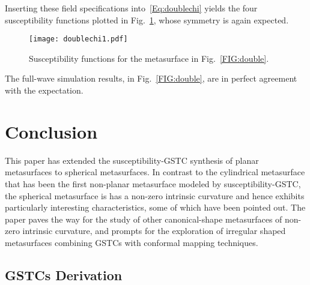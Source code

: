 \documentclass[journal,transaction]{IEEEtran}
\newcommand{\figref}{Fig.~\ref}
\begin{document}
Inserting these field specifications into~\eqref{Eq:doublechi} yields the four susceptibility functions plotted in \figref{FIG:doublechi}, whose symmetry is again expected.

\begin{figure}[!h]
    \centering
         \texttt{[image: doublechi1.pdf]}{
        }
        \caption{Susceptibility functions for the metasurface in \figref{FIG:double}.}
   \label{FIG:doublechi}
\end{figure}

The full-wave simulation results, in \figref{FIG:double}, are in perfect agreement with the expectation.


\section{Conclusion}
\label{sec:concl}

This paper has extended the susceptibility-GSTC synthesis of planar metasurfaces to spherical metasurfaces. In contrast to the cylindrical metasurface that has been the first non-planar metasurface modeled by susceptibility-GSTC, the spherical metasurface is has a non-zero intrinsic curvature and hence exhibits particularly interesting characteristics, some of which have been pointed out. The paper paves the way for the study of other canonical-shape metasurfaces of non-zero intrinsic curvature, and prompts for the exploration of irregular shaped metasurfaces combining GSTCs with conformal mapping techniques.





\appendix
\subsection{GSTCs Derivation}\label{GSTC_Deriv}
\end{document}
